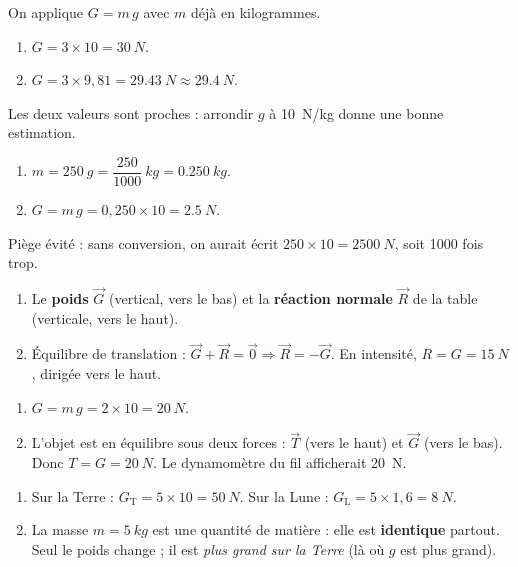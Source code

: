 \documentclass[11pt,a4paper]{article}
\newcommand{\vv}[1]{\vec{#1}}\newcommand{\ds}{\displaystyle}
\begin{document}
\begin{corrige}
On applique $G=m\,g$ avec $m$ déjà en kilogrammes.
\begin{enumerate}[label=\alph*)]
  \item $G = 3\times 10 = \qty{30}{N}$.
  \item $G = 3\times 9{,}81 = \qty{29.43}{N}\approx\qty{29.4}{N}$.
\end{enumerate}
Les deux valeurs sont proches : arrondir $g$ à \qty{10}{N/kg} donne une bonne estimation.
\end{corrige}

\begin{corrige}
\begin{enumerate}[label=\alph*)]
  \item $m = \qty{250}{g} = \dfrac{250}{1000}\ \si{kg} = \qty{0.250}{kg}$.
  \item $G = m\,g = 0{,}250\times 10 = \qty{2.5}{N}$.
\end{enumerate}
Piège évité : sans conversion, on aurait écrit $250\times 10=\qty{2500}{N}$, soit 1000 fois trop.
\end{corrige}

\begin{corrige}
\begin{enumerate}[label=\alph*)]
  \item Le \textbf{poids} $\vv G$ (vertical, vers le bas) et la \textbf{réaction normale} $\vv R$ de la
        table (verticale, vers le haut).
  \item Équilibre de translation : $\vv G + \vv R = \vv 0 \Rightarrow \vv R = -\vv G$. En intensité,
        $R = G = \qty{15}{N}$, dirigée vers le haut.
\end{enumerate}
\end{corrige}

\begin{corrige}
\begin{enumerate}[label=\alph*)]
  \item $G = m\,g = 2\times 10 = \qty{20}{N}$.
  \item L'objet est en équilibre sous deux forces : $\vv T$ (vers le haut) et $\vv G$ (vers le bas).
        Donc $T = G = \qty{20}{N}$. Le dynamomètre du fil afficherait \qty{20}{N}.
\end{enumerate}
\end{corrige}

\begin{corrige}
\begin{enumerate}[label=\alph*)]
  \item Sur la Terre : $G_{\text{T}} = 5\times 10 = \qty{50}{N}$. Sur la Lune :
        $G_{\text{L}} = 5\times 1{,}6 = \qty{8}{N}$.
  \item La masse $m=\qty{5}{kg}$ est une quantité de matière : elle est \textbf{identique} partout.
        Seul le poids change ; il est \emph{plus grand sur la Terre} (là où $g$ est plus grand).
\end{enumerate}
\end{corrige}
\end{document}
